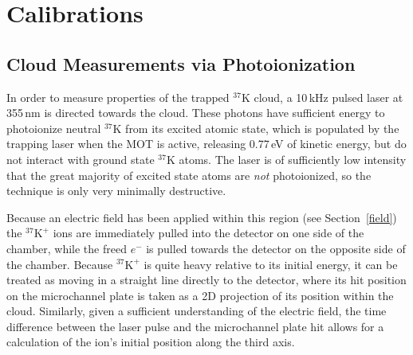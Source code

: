 


\clearpage	
\chapter{Calibrations}
\label{calibrations_chapter}
	
%	
%

\section{Cloud Measurements via Photoionization}
\label{cloud}
\label{photoions}
In order to measure properties of the trapped $^{37}\textrm{K}$ cloud, a 10\,kHz pulsed laser at 355\,nm is directed towards the cloud.  These photons have sufficient energy to photoionize neutral $^{37}\textrm{K}$ from its excited atomic state, which is populated by the trapping laser when the MOT is active, releasing 0.77\,eV of kinetic energy, but do not interact with ground state $^{37}\textrm{K}$ atoms.  The laser is of sufficiently low intensity that the great majority of excited state atoms are \emph{not} photoionized, so the technique is only very minimally destructive.  

Because an electric field has been applied within this region (see Section~\ref{field}) the $^{37}\textrm{K}^+$ ions are immediately pulled into the detector on one side of the chamber, while the freed $e^-$ is pulled towards the detector on the opposite side of the chamber.  Because  $^{37}\textrm{K}^+$ is quite heavy relative to its initial energy, it can be treated as moving in a straight line directly to the detector, where its hit position on the microchannel plate is taken as a 2D projection of its position within the cloud.  Similarly, given a sufficient understanding of the electric field, the time difference between the laser pulse and the microchannel plate hit allows for a calculation of the ion's initial position along the third axis.  

